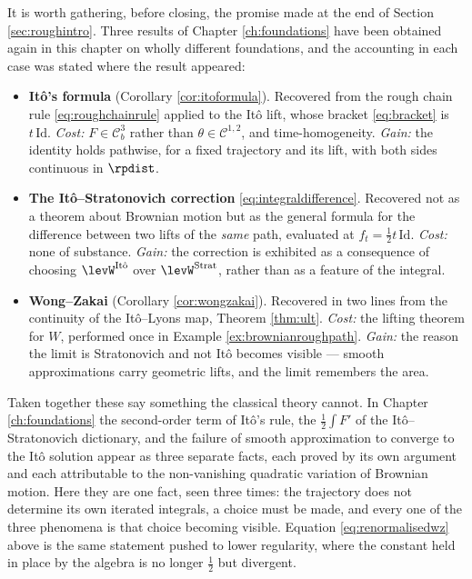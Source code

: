 It is worth gathering, before closing, the promise made at the end of Section
\ref{sec:roughintro}. Three results of Chapter \ref{ch:foundations} have been obtained again in this
chapter on wholly different foundations, and the accounting in each case was stated where the result
appeared:

\begin{itemize}
    \item[i)] \textbf{Itô's formula} (Corollary \ref{cor:itoformula}). Recovered from the rough
    chain rule \eqref{eq:roughchainrule} applied to the Itô lift, whose bracket
    \eqref{eq:bracket} is $t\,\mathrm{Id}$. \emph{Cost:} $F \in \mathcal{C}^3_b$ rather than
    $\theta \in \mathcal{C}^{1,2}$, and time-homogeneity. \emph{Gain:} the identity holds pathwise,
    for a fixed trajectory and its lift, with both sides continuous in $\rpdist$.
    \item[ii)] \textbf{The Itô--Stratonovich correction} \eqref{eq:integraldifference}. Recovered
    not as a theorem about Brownian motion but as the general formula for the difference between
    two lifts of the \emph{same} path, evaluated at $f_t = \tfrac12 t\,\mathrm{Id}$.
    \emph{Cost:} none of substance. \emph{Gain:} the correction is exhibited as a consequence of
    choosing $\levW^{\mathrm{It\hat o}}$ over $\levW^{\mathrm{Strat}}$, rather than as a feature of
    the integral.
    \item[iii)] \textbf{Wong--Zakai} (Corollary \ref{cor:wongzakai}). Recovered in two lines from
    the continuity of the Itô--Lyons map, Theorem \ref{thm:ult}. \emph{Cost:} the lifting theorem
    for $W$, performed once in Example \ref{ex:brownianroughpath}. \emph{Gain:} the reason the
    limit is Stratonovich and not Itô becomes visible --- smooth approximations carry geometric
    lifts, and the limit remembers the area.
\end{itemize}

Taken together these say something the classical theory cannot. In Chapter \ref{ch:foundations} the
second-order term of Itô's rule, the $\tfrac12\int F'$ of the Itô--Stratonovich dictionary, and the
failure of smooth approximation to converge to the Itô solution appear as three separate facts,
each proved by its own argument and each attributable to the non-vanishing quadratic variation of
Brownian motion. Here they are one fact, seen three times: the trajectory does not determine its own
iterated integrals, a choice must be made, and every one of the three phenomena is that choice
becoming visible. Equation \eqref{eq:renormalisedwz} above is the same statement pushed to lower
regularity, where the constant held in place by the algebra is no longer $\tfrac12$ but divergent.
